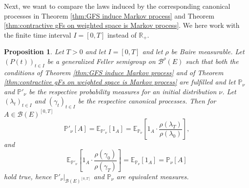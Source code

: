 \documentclass[a4paper,12pt]{article}
\newtheorem{proposition}[theorem]{Proposition}
\theoremstyle{definition}
\theoremstyle{remark}
\numberwithin{equation}{section}
\numberwithin{theorem}{section}
\begin{document}
Next, we want to compare the laws induced by the corresponding canonical
processes in Theorem \ref{thm:GFS induce Markov process} and Theorem
\ref{thm:contractive gFs on weighted space is Markov process}. We here work with the finite time interval $I=[0,T]$ instead of $\mathbb{R}_+$.

\begin{proposition} 
\label{prop:gFp and gamma process comparison} Let $T>0$ and let $I=\left[0,T\right]$ and let $\rho$ be Baire measurable. Let $\left(P(t)\right)_{t\in I}$
be a generalized Feller semigroup on $\mathcal{\mathscr{B}}^{\rho}(E)$
such that both the conditions of Theorem \ref{thm:GFS induce Markov process}
and of Theorem \ref{thm:contractive gFs on weighted space is Markov process}
are fulfilled and let  $\mathbb{\mathbb{P}{}_{\nu}}$ and $\mathbb{P}'_{\nu}$ be the respective probability measures for an initial distribution $\nu$. Let $\left(\lambda_{t}\right)_{t\in I}$ and $\left(\gamma_{t}\right)_{t\in I}$ be the respective canonical processes.
Then for $A\in\mathcal{B}(E)^{\left[0,T\right]}$
\[
\mathbb{P}'_{\nu}\left[A\right]=\mathbb{E}_{\mathbb{P}'_{\nu}}\left[1_{A}\right]=\mathbb{E}_{\mathbb{P}{}_{\nu}}\left[1_{A}\cdot\frac{\rho(\lambda_{T})}{\rho(\lambda_{0})}\right],
\]
 and 
\[
\mathbb{E}_{\mathbb{P}'_{\nu}}\left[1_{A}\cdot\frac{\rho(\gamma_{0})}{\rho(\gamma_{T})}\right]=\mathbb{E}_{\mathbb{P}{}_{\nu}}\left[1_{A}\right]=\mathbb{P}{}_{\nu}\left[A\right]
\]
hold true, hence $\left.\mathbb{P}'_{\nu}\right|_{\mathcal{B}(E)^{\left[0,T\right]}}$
and $\mathbb{P}{}_{\nu}$ are equivalent measures. 
\end{proposition}
\end{document}
